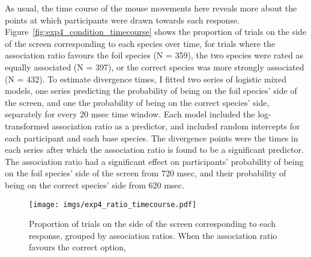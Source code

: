 As usual, the time course of  the mouse movements here
reveals more about the points at which participants were
drawn towards each response.
Figure~\ref{fig:exp4_condition_timecourse} shows the proportion of trials
on the side of the screen corresponding to each species over time,
for trials where the association ratio favours the foil species (N = 359),
the two species were rated as equally associated (N = 397),
or the correct species was more strongly associated (N = 432).
To estimate divergence times,
I fitted two series of logistic mixed models,
one series predicting the probability of being on the foil species' side of the screen,
and one the probability of being on the correct species' side,
separately for every 20 msec time window.
Each model included the log-transformed association ratio  as a predictor,
and included random intercepts for each participant and each base species.
The divergence points were the times in each series
after which the association ratio is found to be a significant predictor.
The association ratio had a significant effect on
participants' probability of being on the foil species'
side of the screen from 720 msec,
and their probability of being on the correct species' side from 620 msec.

\begin{figure}[h]
  \centering
  \texttt{[image: imgs/exp4\_ratio\_timecourse.pdf]}
  \caption[Time course, separately for different association ratios, in Experiment 4.]{
    Proportion of trials on the side of the screen corresponding to each response,
    grouped by association ratios.
    When the association ratio favours the correct option,
    \label{fig:exp4_ratio_timecourse} }
\end{figure}

